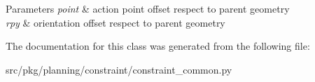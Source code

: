 \begin{DoxyParams}{Parameters}
{\em point} & action point offset respect to parent geometry \\
\hline
{\em rpy} & orientation offset respect to parent geometry \\
\hline
\end{DoxyParams}


The documentation for this class was generated from the following file\+:\begin{DoxyCompactItemize}
\item 
src/pkg/planning/constraint/constraint\+\_\+common.\+py\end{DoxyCompactItemize}
